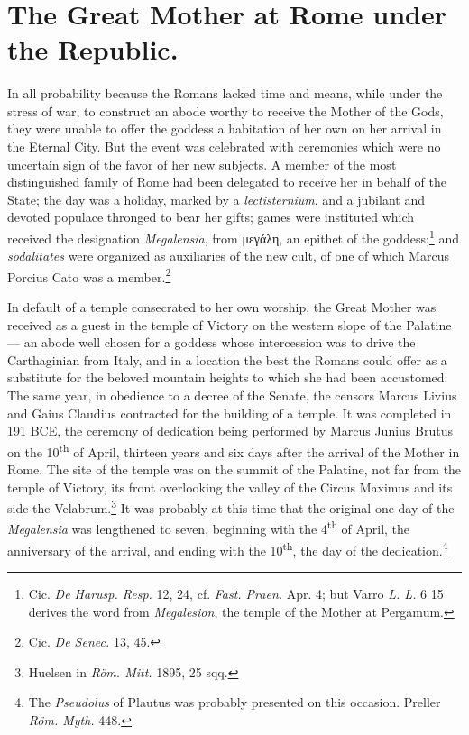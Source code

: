 \documentclass[a4paper, 11pt, oneside, polutonikogreek, french]{article}
\begin{document}
\section{The Great Mother at Rome under the Republic.}
\paragraph{}
In all probability because the Romans lacked time and means, while under the stress of war, to construct an abode worthy to receive the Mother of the Gods, they were unable to offer the goddess a habitation of her own on her arrival in the Eternal City. But the event was celebrated with ceremonies which were no uncertain sign of the favor of her new subjects. A member of the most distinguished family of Rome had been delegated to receive her in behalf of the State; the day was a holiday, marked by a \emph{lectisternium}, and a jubilant and devoted populace thronged to bear her gifts; games were instituted which received the designation \emph{Megalensia}, from μεγάλη, an epithet of the goddess;\footnote{Cic. \emph{De Harusp. Resp.} 12, 24, cf. \emph{Fast. Praen.} Apr. 4; but Varro \emph{L. L.} 6 15 derives the word from \emph{Megalesion}, the temple of the Mother at Pergamum.} and \emph{sodalitates} were organized as auxiliaries of the new cult, of one of which Marcus Porcius Cato was a member.\footnote{Cic. \emph{De Senec.} 13, 45.}

In default of a temple consecrated to her own worship, the Great Mother was received as a guest in the temple of Victory on the western slope of the Palatine --- an abode well chosen for a goddess whose intercession was to drive the Carthaginian from Italy, and in a location the best the Romans could offer as a substitute for the beloved mountain heights to which she had been accustomed. The same year, in obedience to a decree of the Senate, the censors Marcus Livius and Gaius Claudius contracted for the building of a temple. It was completed in 191 \textsc{BCE}, the ceremony of dedication being performed by Marcus Junius Brutus on the 10\textsuperscript{th} of April, thirteen years and six days after the arrival of the Mother in Rome. The site of the temple was on the summit of the Palatine, not far from the temple of Victory, its front overlooking the valley of the Circus Maximus and its side the Velabrum.\footnote{Huelsen in \emph{Röm. Mitt.} 1895, 25 sqq.} It was probably at this time that the original one day of the \emph{Megalensia} was lengthened to seven, beginning with the 4\textsuperscript{th} of April, the anniversary of the arrival, and ending with the 10\textsuperscript{th}, the day of the dedication.\footnote{The \emph{Pseudolus} of Plautus was probably presented on this occasion. Preller \emph{Röm. Myth.} 448.}
\end{document}
